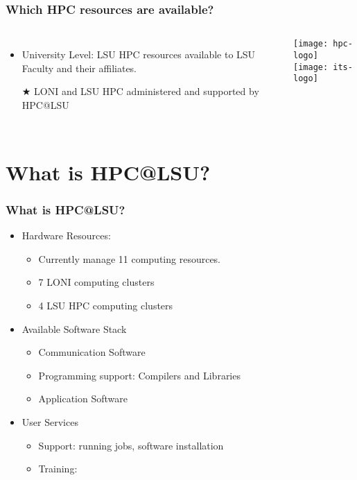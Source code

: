 \documentclass[slidestop,mathserif,compress,xcolor=svgnames,table]{beamer}
\begin{document}
\begin{frame}
  \frametitle{\small Which HPC resources are available?}
  \begin{columns}
    \begin{itemize}
      \item University Level: LSU HPC resources available to LSU Faculty and their affiliates.
      \item[$\bigstar$] LONI and LSU HPC administered and supported by HPC@LSU
    \end{itemize}
    \begin{center}
      \texttt{[image: hpc-logo]}\\
      \vspace{0.5cm}
      \texttt{[image: its-logo]}
    \end{center}
  \end{columns}
\end{frame}


\section{What is HPC@LSU?}
\begin{frame}
  \frametitle{\small What is HPC@LSU?}
  \begin{itemize}
    \item Hardware Resources:
    \begin{itemize}
      \item Currently manage 11 computing resources.
      \item 7 LONI computing clusters
      \item 4 LSU HPC computing clusters
    \end{itemize}
    \item Available Software Stack
    \begin{itemize}
      \item Communication Software
      \item Programming support: Compilers and Libraries
      \item Application Software
    \end{itemize}
    \item User Services
    \begin{itemize}
      \item Support: running jobs, software installation 
      \item Training: 
    \end{itemize}
  \end{itemize}
\end{frame}
\end{document}
